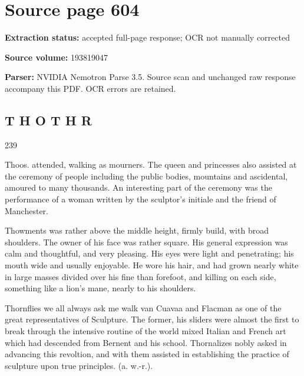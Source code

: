 \clearpage
\section{Source page 604}
\textbf{Extraction status:} accepted full-page response; OCR not manually corrected\par
\textbf{Source volume:} 193819047\par
\textbf{Parser:} NVIDIA Nemotron Parse 3.5. Source scan and unchanged raw response accompany this PDF. OCR errors are retained.\par\medskip
\subsection*{T H O T H R}
239\par\medskip
Thoos. attended, walking as mourners. The queen and princesses also assisted at the ceremony of people including the public bodies, mountains and ascidental, amoured to many thousands. An interesting part of the ceremony was the performance of a woman written by the sculptor’s initiale and the friend of Manchester.\par\medskip
Thowments was rather above the middle height, firmly build, with broad shoulders. The owner of his face was rather square. His general expression was calm and thoughtful, and very pleasing. His eyes were light and penetrating; his mouth wide and usually enjoyable. He wore his hair, and had grown nearly white in large masses divided over his fine than forefoot, and killing on each side, something like a lion’s mane, nearly to his shoulders.\par\medskip
Thornflies we all always ask me walk van Cuavaa and Flacman as one of the great representatives of Sculpture. The former, his sliders were almost the first to break through the intensive routine of the world mixed Italian and French art which had descended from Bernent and his school. Thornalizes nobly asked in advancing this revoltion, and with them assisted in establishing the practice of sculpture upon true principles. (a. w.-r.).\par\medskip
